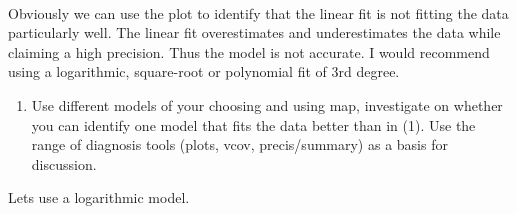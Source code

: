 \documentclass[11pt]{article}
\providecommand{\tightlist}{%
      \setlength{\itemsep}{0pt}\setlength{\parskip}{0pt}}
\begin{document}
    \begin{center}
    \end{center}
    { \hspace*{\fill} \\}
    
    Obviously we can use the plot to identify that the linear fit is not
fitting the data particularly well. The linear fit overestimates and
underestimates the data while claiming a high precision. Thus the model
is not accurate. I would recommend using a logarithmic, square-root or
polynomial fit of 3rd degree.

    \begin{enumerate}
\def\labelenumi{\arabic{enumi}.}
\setcounter{enumi}{1}
\tightlist
\item
  Use different models of your choosing and using map, investigate on
  whether you can identify one model that fits the data better than in
  (1). Use the range of diagnosis tools (plots, vcov, precis/summary) as
  a basis for discussion.
\end{enumerate}

    Lets use a logarithmic model.
\end{document}
